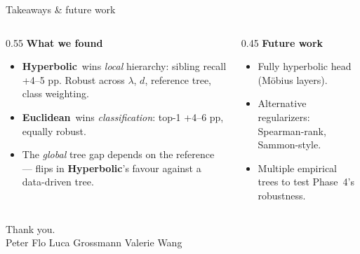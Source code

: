 \documentclass[aspectratio=169,11pt]{beamer}
\newcommand{\Eu}{\textcolor{eu}{\textbf{Euclidean}}}
\newcommand{\Hy}{\textcolor{hy}{\textbf{Hyperbolic}}}
\begin{document}
\begin{frame}{Takeaways \& future work}
  \begin{columns}[T,onlytextwidth]
    \begin{column}{0.55\textwidth}
      \textbf{What we found}
      \begin{itemize}\setlength\itemsep{0.15em}
        \item \Hy\ wins \emph{local} hierarchy: sibling recall +4--5 pp.
              Robust across $\lambda$, $d$, reference tree, class weighting.
        \item \Eu\ wins \emph{classification}: top-1 +4--6 pp, equally robust.
        \item The \emph{global} tree gap depends on the reference ---
              flips in \Hy's favour against a data-driven tree.
      \end{itemize}
    \end{column}
    \begin{column}{0.45\textwidth}
      \textbf{Future work}
      \begin{itemize}\setlength\itemsep{0.15em}
        \item Fully hyperbolic head (M\"obius layers).
        \item Alternative regularizers: Spearman-rank, Sammon-style.
        \item Multiple empirical trees to test Phase~4's robustness.
      \end{itemize}
    \end{column}
  \end{columns}
\end{frame}

\begin{frame}[standout]
  Thank you.\\[0.4em]
  {\normalsize Peter Flo \enspace\textbar\enspace Luca Grossmann
   \enspace\textbar\enspace Valerie Wang}
\end{frame}

\appendix
\end{document}
